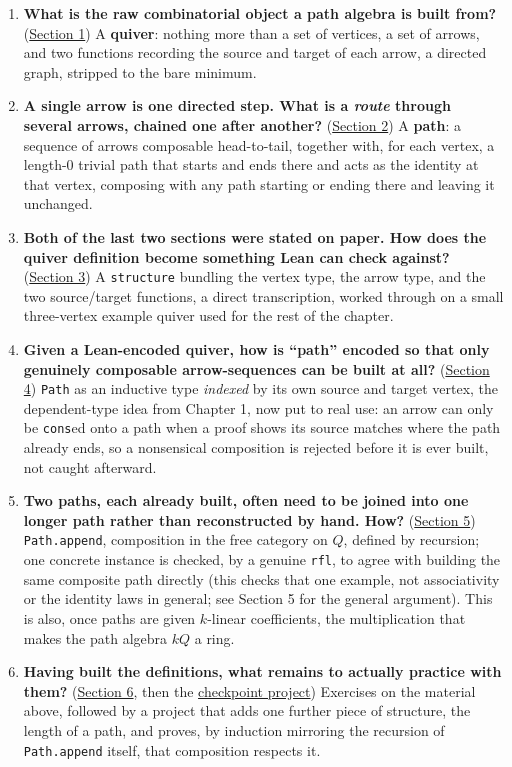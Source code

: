 \begin{enumerate}
\def\labelenumi{\arabic{enumi}.}
\tightlist
\item
  \textbf{What is the raw combinatorial object a path algebra is built from?} (\hyperref[sec:11-path-algebras:01-what-is-a-quiver:1]{Section 1}) A \textbf{quiver}: nothing more than a set of vertices, a set of arrows, and two functions recording the source and target of each arrow, a directed graph, stripped to the bare minimum.
\item
  \textbf{A single arrow is one directed step. What is a \emph{route} through several arrows, chained one after another?} (\hyperref[sec:11-path-algebras:02-paths:1]{Section 2}) A \textbf{path}: a sequence of arrows composable head-to-tail, together with, for each vertex, a length-\(0\) trivial path that starts and ends there and acts as the identity at that vertex, composing with any path starting or ending there and leaving it unchanged.
\item
  \textbf{Both of the last two sections were stated on paper. How does the quiver definition become something Lean can check against?} (\hyperref[sec:11-path-algebras:03-defining-a-quiver:1]{Section 3}) A \texttt{structure} bundling the vertex type, the arrow type, and the two source/target functions, a direct transcription, worked through on a small three-vertex example quiver used for the rest of the chapter.
\item
  \textbf{Given a Lean-encoded quiver, how is ``path'' encoded so that only genuinely composable arrow-sequences can be built at all?} (\hyperref[sec:11-path-algebras:04-paths-as-inductive-type:1]{Section 4}) \texttt{Path} as an inductive type \emph{indexed} by its own source and target vertex, the dependent-type idea from Chapter 1, now put to real use: an arrow can only be \texttt{cons}ed onto a path when a proof shows its source matches where the path already ends, so a nonsensical composition is rejected before it is ever built, not caught afterward.
\item
  \textbf{Two paths, each already built, often need to be joined into one longer path rather than reconstructed by hand. How?} (\hyperref[sec:11-path-algebras:05-path-composition:1]{Section 5}) \texttt{Path.append}, composition in the free category on \(Q\), defined by recursion; one concrete instance is checked, by a genuine \texttt{rfl}, to agree with building the same composite path directly (this checks that one example, not associativity or the identity laws in general; see Section 5 for the general argument). This is also, once paths are given \(k\)-linear coefficients, the multiplication that makes the path algebra \(kQ\) a ring.
\item
  \textbf{Having built the definitions, what remains to actually practice with them?} (\hyperref[sec:11-path-algebras:06-exercises:1]{Section 6}, then the \hyperref[sec:11-path-algebras:07-checkpoint-project:1]{checkpoint project}) Exercises on the material above, followed by a project that adds one further piece of structure, the length of a path, and proves, by induction mirroring the recursion of \texttt{Path.append} itself, that composition respects it.
\end{enumerate}

